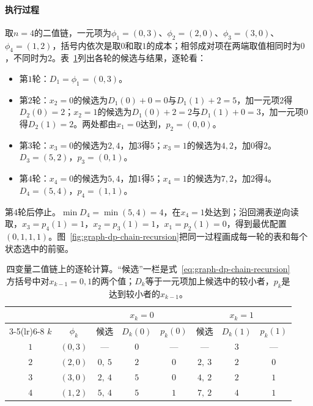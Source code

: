 \paragraph{执行过程}
取$n=4$的二值链，一元项为$\phi_1=(0,3)$、$\phi_2=(2,0)$、$\phi_3=(3,0)$、$\phi_4=(1,2)$，括号内依次是取$0$和取$1$的成本；相邻成对项在两端取值相同时为$0$，不同时为$2$。表~\ref{tab:graph-dp-chain-trace}列出各轮的候选与结果，逐轮看：
\begin{itemize}
  \item 第$1$轮：$D_1=\phi_1=(0,3)$。
  \item 第$2$轮：$x_2=0$的候选为$D_1(0)+0=0$与$D_1(1)+2=5$，加一元项$2$得$D_2(0)=2$；$x_2=1$的候选为$D_1(0)+2=2$与$D_1(1)+0=3$，加一元项$0$得$D_2(1)=2$。两处都由$x_1=0$达到，$p_2=(0,0)$。
  \item 第$3$轮：$x_3=0$的候选为$2,4$，加$3$得$5$；$x_3=1$的候选为$4,2$，加$0$得$2$。$D_3=(5,2)$，$p_3=(0,1)$。
  \item 第$4$轮：$x_4=0$的候选为$5,4$，加$1$得$5$；$x_4=1$的候选为$7,2$，加$2$得$4$。$D_4=(5,4)$，$p_4=(1,1)$。
\end{itemize}
第$4$轮后停止。$\min D_4=\min(5,4)=4$，在$x_4=1$处达到；沿回溯表逆向读取，$x_3=p_4(1)=1$，$x_2=p_3(1)=1$，$x_1=p_2(1)=0$，得到最优配置$(0,1,1,1)$。图~\ref{fig:graph-dp-chain-recursion}把同一过程画成每一轮的表和每个状态选中的前驱。

\begin{table}[!htb]
  \centering
  \caption{四变量二值链上的逐轮计算。“候选”一栏是式~\eqref{eq:graph-dp-chain-recursion}方括号中对$x_{k-1}=0,1$的两个值；$D_k$等于一元项加上候选中的较小者，$p_k$是达到较小者的$x_{k-1}$。}
  \label{tab:graph-dp-chain-trace}
  \small
  \begin{tabular}{@{}cccccccc@{}}
    \toprule
    & & \multicolumn{3}{c}{$x_k=0$} & \multicolumn{3}{c}{$x_k=1$}\\
    \cmidrule(lr){3-5}\cmidrule(lr){6-8}
    $k$ & $\phi_k$ & 候选 & $D_k(0)$ & $p_k(0)$ & 候选 & $D_k(1)$ & $p_k(1)$\\
    \midrule
    $1$ & $(0,3)$ & — & $0$ & — & — & $3$ & —\\
    $2$ & $(2,0)$ & $0,\ 5$ & $2$ & $0$ & $2,\ 3$ & $2$ & $0$\\
    $3$ & $(3,0)$ & $2,\ 4$ & $5$ & $0$ & $4,\ 2$ & $2$ & $1$\\
    $4$ & $(1,2)$ & $5,\ 4$ & $5$ & $1$ & $7,\ 2$ & $4$ & $1$\\
    \bottomrule
  \end{tabular}
\end{table}

